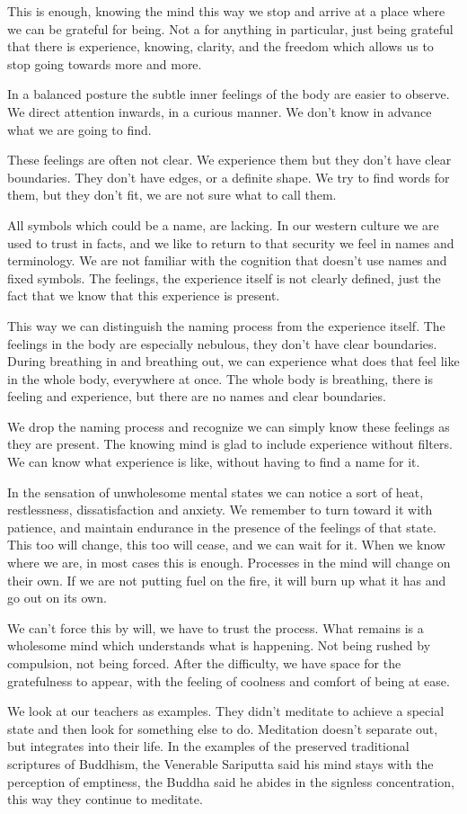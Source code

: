 This is enough, knowing the mind this way we stop and arrive at a place
where we can be grateful for being. Not a for anything in particular,
just being grateful that there is experience, knowing, clarity, and the
freedom which allows us to stop going towards more and more.

In a balanced posture the subtle inner feelings of the body are easier
to observe. We direct attention inwards, in a curious manner. We don't
know in advance what we are going to find.

These feelings are often not clear. We experience them but they don't
have clear boundaries. They don't have edges, or a definite shape. We
try to find words for them, but they don't fit, we are not sure what to
call them.

All symbols which could be a name, are lacking. In our western culture
we are used to trust in facts, and we like to return to that security we
feel in names and terminology. We are not familiar with the cognition
that doesn't use names and fixed symbols. The feelings, the experience
itself is not clearly defined, just the fact that we know that this
experience is present.

This way we can distinguish the naming process from the experience
itself. The feelings in the body are especially nebulous, they don't
have clear boundaries. During breathing in and breathing out, we can
experience what does that feel like in the whole body, everywhere at
once. The whole body is breathing, there is feeling and experience, but
there are no names and clear boundaries.

We drop the naming process and recognize we can simply know these
feelings as they are present. The knowing mind is glad to include
experience without filters. We can know what experience is like, without
having to find a name for it.

In the sensation of unwholesome mental states we can notice a sort of
heat, restlessness, dissatisfaction and anxiety. We remember to turn
toward it with patience, and maintain endurance in the presence of the
feelings of that state. This too will change, this too will cease, and
we can wait for it. When we know where we are, in most cases this is
enough. Processes in the mind will change on their own. If we are not
putting fuel on the fire, it will burn up what it has and go out on its
own.

We can't force this by will, we have to trust the process. What remains
is a wholesome mind which understands what is happening. Not being
rushed by compulsion, not being forced. After the difficulty, we have
space for the gratefulness to appear, with the feeling of coolness and
comfort of being at ease.

We look at our teachers as examples. They didn't meditate to achieve a
special state and then look for something else to do. Meditation doesn't
separate out, but integrates into their life. In the examples of the
preserved traditional scriptures of Buddhism, the Venerable Sariputta
said his mind stays with the perception of emptiness, the Buddha said he
abides in the signless concentration, this way they continue to
meditate.
